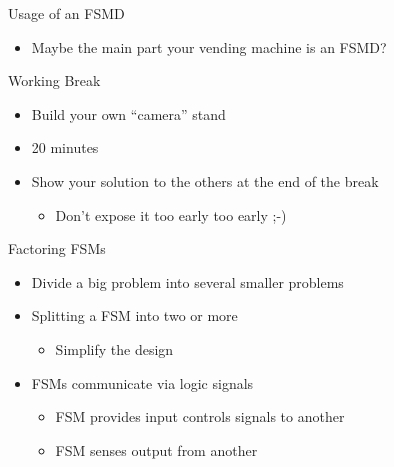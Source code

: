 \begin{frame}[fragile]{Usage of an FSMD}
\begin{itemize}
\item Maybe the main part your vending machine is an FSMD?
\end{itemize}
\end{frame}

\begin{frame}[fragile]{Working Break}
\begin{itemize}
\item Build your own ``camera'' stand
\item 20 minutes
\item Show your solution to the others at the end of the break
\begin{itemize}
\item Don't expose it too early too early ;-)
\end{itemize}
\end{itemize}
\end{frame}


\begin{frame}[fragile]{Factoring FSMs}
\begin{itemize}
\item Divide a big problem into several smaller problems
\item Splitting a FSM into two or more
\begin{itemize}
\item Simplify the design
\end{itemize}
\item FSMs communicate via logic signals
\begin{itemize}
\item FSM provides input controls signals to another
\item FSM senses output from another
\end{itemize}
\end{itemize}
\end{frame}

